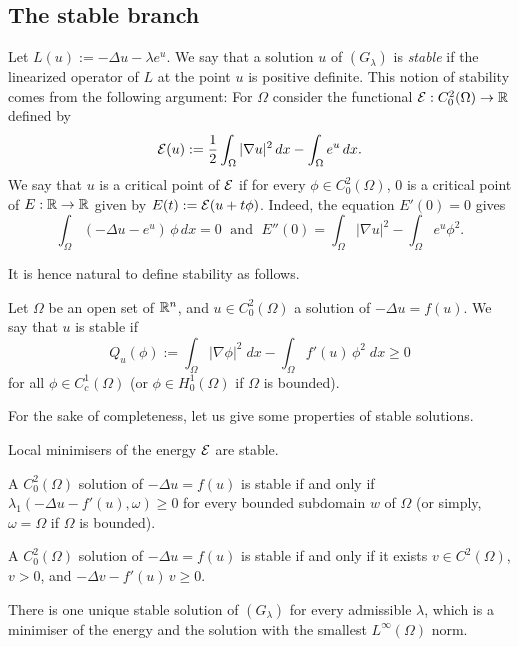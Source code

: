 
\subsection{The stable branch}
\label{sec:stable-branch}

Let $L(u):=-\Delta u - \lambda e ^ u$. We say that a solution $u$ of
$(G_\lambda)$ is \textit{stable} if the linearized operator of $L$ at the point
$u$ is positive definite. This notion of stability comes from the following
argument: For $\Omega$ consider the functional $\mathcal{E}:C_0^2(\Omega)\to\mathbb{R}$
defined by
\begin{equation}
    \mathcal{E}(u):= \frac{1}{2}\int_\Omega |\nabla u|^2\, dx - \int_\Omega e^u\, dx.
\end{equation}
We say that $u$ is a critical point of $\mathcal{E}$ if for every $\phi\in
C_0^2(\Omega)$, $0$ is a critical point of $E:\mathbb{R}\to \mathbb{R}$ given by
$E(t):=\mathcal{E}(u+t\phi)$. Indeed, the equation $E'(0)=0$ gives
\begin{equation}
    \int_\Omega (-\Delta u-e^u)\,\phi \, dx = 0\; \mbox{ and }\;
    E''(0)=\int_\Omega|\nabla u|^2 - \int_\Omega e^u\phi^2.
\end{equation}

It is hence natural to define stability as follows.

\begin{definition} Let $\Omega$ be an open set of $\mathbb{R}^n$, and $u\in
    C_0^2(\Omega)$ a solution of $-\Delta u = f(u)$. We say that $u$ is stable
    if
    $$
    Q_u(\phi):=\int_\Omega|\nabla \phi|^2\;dx - \int_\Omega f'(u)\,\phi^2\;dx
    \geq 0
    $$
    for all $\phi\in C_c^1(\Omega)$ (or $\phi\in H_0^1(\Omega)$ if $\Omega$ is
    bounded).
\end{definition}

For the sake of completeness, let us give some properties of stable solutions.

\begin{proposition} Local minimisers of the energy $\mathcal{E}$ are stable.
\end{proposition}

\begin{proposition} A $C_0^2(\Omega)$ solution of $-\Delta u = f(u)$ is stable
    if and only if $\lambda_1(-\Delta u-f'(u),\omega)\geq 0$ for every bounded
    subdomain $w$ of $\Omega$ (or simply, $\omega=\Omega$ if $\Omega$ is
    bounded).
\end{proposition}
\begin{proposition} A $C_0^2(\Omega)$ solution of $-\Delta u = f(u)$ is stable
    if and only if it exists $v\in C^2(\Omega)$, $v>0$, and $-\Delta v -f'(u)\,
    v\geq 0.$
\end{proposition}
\begin{proposition} There is one unique stable solution of $(G_\lambda)$ for
    every admissible $\lambda$, which is a minimiser of the energy and the
    solution with the smallest $L^\infty(\Omega)$ norm.
\end{proposition}


